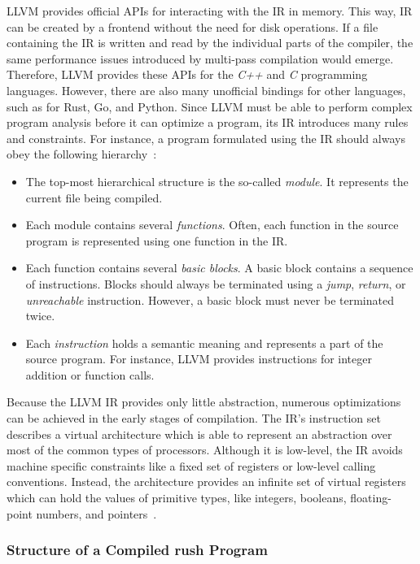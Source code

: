 LLVM provides official APIs for interacting with the IR in memory.
This way, IR can be created by a frontend without the need for disk operations.
If a file containing the IR is written and read by the individual parts of the compiler,
the same performance issues introduced by multi-pass compilation would emerge.
Therefore, LLVM provides these APIs for the \emph{C++} and \emph{C} programming languages.
However, there are also many unofficial bindings for other languages, such as for Rust, Go, and Python.
Since LLVM must be able to perform complex program analysis before it can optimize a program,
its IR introduces many rules and constraints.
For instance, a program formulated using the IR should always obey the following hierarchy~\cite[pp.~211--213]{Hsu2021-ez}:

\begin{itemize}
	\item The top-most hierarchical structure is the so-called \emph{module}.
	      It represents the current file being compiled.
	\item Each module contains several \emph{functions}.
	      Often, each function in the source program is represented using one function in the IR\@.
	\item Each function contains several \emph{basic blocks}.
	      A basic block contains a sequence of instructions.
	      Blocks should always be terminated using a \emph{jump}, \emph{return}, or \emph{unreachable} instruction.
	      However, a basic block must never be terminated twice.
	\item Each \emph{instruction} holds a semantic meaning and represents a part of the source program.
	      For instance, LLVM provides instructions for integer addition or function calls.
\end{itemize}

Because the LLVM IR provides only little abstraction, numerous optimizations can be achieved in the early stages of compilation.
The IR's instruction set describes a virtual architecture which is able to represent an abstraction over most of the common types of processors.
Although it is low-level, the IR avoids machine specific constraints like a fixed set of registers or low-level calling conventions.
Instead, the architecture provides an infinite set of virtual registers which can hold the values of primitive types, like integers, booleans, floating-point numbers, and pointers~\cite[p.~14-17]{Lattner:MSThesis02}.

\subsubsection{Structure of a Compiled rush Program}


